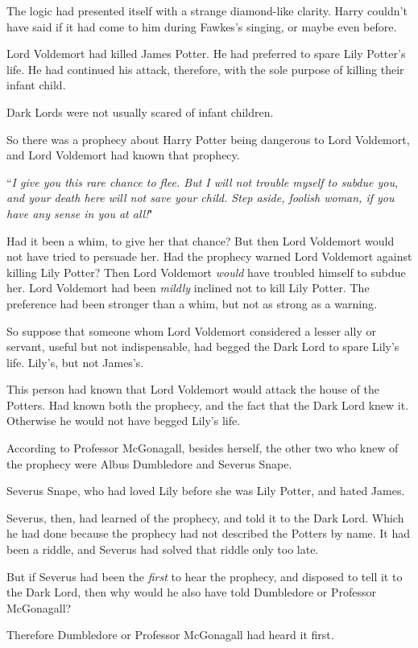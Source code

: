 The logic had presented itself with a strange diamond-like clarity. Harry couldn't have said if it had come to him during Fawkes's singing, or maybe even before.

Lord Voldemort had killed James Potter. He had preferred to spare Lily Potter's life. He had continued his attack, therefore, with the sole purpose of killing their infant child.

Dark Lords were not usually scared of infant children.

So there was a prophecy about Harry Potter being dangerous to Lord Voldemort, and Lord Voldemort had known that prophecy.

``\emph{I give you this rare chance to flee. But I will not trouble myself to subdue you, and your death here will not save your child. Step aside, foolish woman, if you have any sense in you at all!}"

Had it been a whim, to give her that chance? But then Lord Voldemort would not have tried to persuade her. Had the prophecy warned Lord Voldemort against killing Lily Potter? Then Lord Voldemort \emph{would} have troubled himself to subdue her. Lord Voldemort had been \emph{mildly} inclined not to kill Lily Potter. The preference had been stronger than a whim, but not as strong as a warning.

So suppose that someone whom Lord Voldemort considered a lesser ally or servant, useful but not indispensable, had begged the Dark Lord to spare Lily's life. Lily's, but not James's.

This person had known that Lord Voldemort would attack the house of the Potters. Had known both the prophecy, and the fact that the Dark Lord knew it. Otherwise he would not have begged Lily's life.

According to Professor McGonagall, besides herself, the other two who knew of the prophecy were Albus Dumbledore and Severus Snape.

Severus Snape, who had loved Lily before she was Lily Potter, and hated James.

Severus, then, had learned of the prophecy, and told it to the Dark Lord. Which he had done because the prophecy had not described the Potters by name. It had been a riddle, and Severus had solved that riddle only too late.

But if Severus had been the \emph{first} to hear the prophecy, and disposed to tell it to the Dark Lord, then why would he also have told Dumbledore or Professor McGonagall?

Therefore Dumbledore or Professor McGonagall had heard it first.

